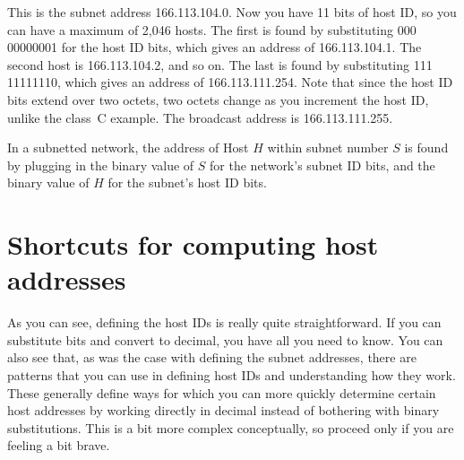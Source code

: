 This is the subnet address 166.113.104.0. Now you have 11 bits of host
ID, so you can have a maximum of 2,046 hosts. The first is found by
substituting 000 00000001 for the host ID bits, which gives an address
of 166.113.104.1. The second host is 166.113.104.2, and so on. The last
is found by substituting 111 11111110, which gives an address of
166.113.111.254. Note that since the host ID bits extend over two
octets, two octets change as you increment the host ID, unlike the class~C example. The broadcast address is 166.113.111.255.

\begin{keyconcept}
In a subnetted network, the address of Host $H$ within subnet number $S$ is found by
plugging in the binary value of $S$ for the network's subnet ID bits, and the binary value of
$H$ for the subnet's host ID bits.
\end{keyconcept}



\section{Shortcuts for computing host addresses}

As you can see, defining the host IDs is really quite straightforward. If
you can substitute bits and convert to decimal, you have all you need to
know. You can also see that, as was the case with defining the subnet
addresses, there are patterns that you can use in defining host IDs and
understanding how they work. These generally define ways for which you
can more quickly determine certain host addresses by working directly in
decimal instead of bothering with binary substitutions. This is a bit
more complex conceptually, so proceed only if you are feeling a bit
brave.

